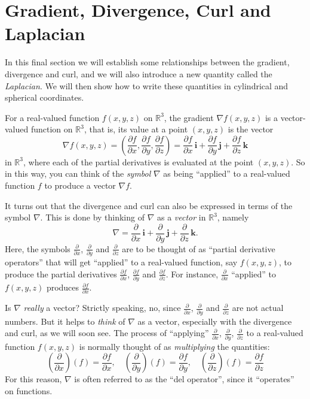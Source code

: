 \section{Gradient, Divergence, Curl and Laplacian}

In this final section we will establish some relationships between the gradient, divergence and curl, and we will also introduce a new quantity called the \emph{Laplacian}. We will then show how to write these quantities in cylindrical and spherical coordinates.

For a real-valued function $f(x,y,z)$ on $\mathbb{R}^{3}$, the gradient $\nabla f(x,y,z)$ is a vector-valued function on $\mathbb{R}^{3}$, that is, its value at a point $(x,y,z)$ is the vector
\[
 \nabla f(x,y,z) = \left( \frac{\partial f}{\partial x},\frac{\partial f}{\partial y},\frac{\partial f}{\partial z}
  \right) =
 \frac{\partial f}{\partial x}\,\textbf{i} + \frac{\partial f}{\partial y}\,\textbf{j} +
 \frac{\partial f}{\partial z}\,\textbf{k}
\]
in $\mathbb{R}^{3}$, where each of the partial derivatives is evaluated at the point $(x,y,z)$. So in this way, you can think of the \emph{symbol} $\nabla$ as being ``applied'' to a real-valued function $f$ to produce a vector $\nabla f$.

It turns out that the divergence and curl can also be expressed in terms of the symbol $\nabla$. This is done by thinking of $\nabla$ as a \emph{vector} in $\mathbb{R}^{3}$, namely\index{$\nabla$}
\[
 \nabla = \frac{\partial}{\partial x}\,\textbf{i} + \frac{\partial}{\partial y}\,\textbf{j} +
   \frac{\partial}{\partial z}\,\textbf{k} .
\]
Here, the symbols $\frac{\partial}{\partial x}$, $ \frac{\partial}{\partial y}$ and $\frac{\partial}{\partial z}$ are to be thought of as ``partial derivative operators'' that will get ``applied'' to a real-valued function, say $f(x,y,z)$, to produce the partial derivatives $\frac{\partial f}{\partial x}$, $\frac{\partial f}{\partial y}$ and $\frac{\partial f}{\partial z}$. For instance, $\frac{\partial}{\partial x}$ ``applied'' to $f(x,y,z)$ produces $\frac{\partial f}{\partial x}$.

Is $\nabla$ \emph{really} a vector? Strictly speaking, no, since $\frac{\partial}{\partial x}$, $\frac{\partial}{\partial y}$ and $\frac{\partial}{\partial z}$ are not actual numbers. But it helps to \emph{think} of $\nabla$ as a vector, especially with the divergence and curl, as we will soon see. The process of ``applying'' $\frac{\partial}{\partial x}$, $\frac{\partial}{\partial y}$, $\frac{\partial}{\partial z}$ to a real-valued function $f(x,y,z)$ is normally thought of as \emph{multiplying} the quantities:
\[
 \left( \frac{\partial}{\partial x} \right) (f) = \frac{\partial f}{\partial x} ,\quad
 \left( \frac{\partial}{\partial y} \right) (f) = \frac{\partial f}{\partial y} ,\quad
 \left( \frac{\partial}{\partial z} \right) (f) = \frac{\partial f}{\partial z}
\]
For this reason, $\nabla$ is often referred to as the ``del operator'', since it ``operates'' on functions.
 
